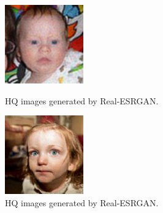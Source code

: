 \begin{figure}[htbp]
    \centering
    \begin{minipage}{0.45\textwidth}
        \centering
        \includegraphics[width=\textwidth]{imgs/00328.png}
        \caption{HQ images generated by Real-ESRGAN.}
        \label{fig:image3}
    \end{minipage}\hfill
    \begin{minipage}{0.45\textwidth}
        \centering
        \includegraphics[width=\textwidth]{imgs/00386.png}
        \caption{HQ images generated by Real-ESRGAN.}
        \label{fig:image4}
    \end{minipage}
\end{figure}

